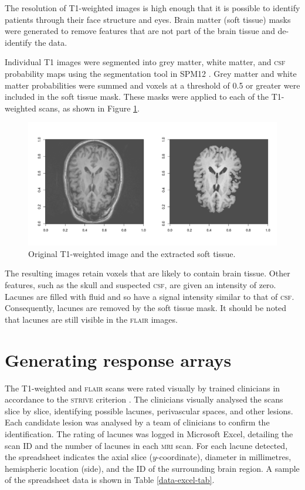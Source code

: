 The resolution of T1-weighted images is high enough that it is possible to identify patients through their face structure and eyes. Brain matter (soft tissue) masks were generated to remove features that are not part of the brain tissue and de-identify the data.

Individual T1 images were segmented into grey matter, white matter, and \textsc{csf} probability maps using the segmentation tool in SPM12 \citeyearpar{spm12}. Grey matter and white matter probabilities were summed and voxels at a threshold of 0.5 or greater were included in the soft tissue mask. These masks were applied to each of the T1-weighted scans, as shown in Figure \ref{data-t1-soft-fig}.

\begin{figure}[ht]
\centering
\includegraphics[width=\linewidth]{Images/6_t1_soft_eg.png}
\caption{Original T1-weighted image and the extracted soft tissue.}
\label{data-t1-soft-fig}
\end{figure}

The resulting images retain voxels that are likely to contain brain tissue. Other features, such as the skull and suspected \textsc{csf}, are given an intensity of zero. Lacunes are filled with fluid and so have a signal intensity similar to that of \textsc{csf}. Consequently, lacunes are removed by the soft tissue mask. It should be noted that lacunes are still visible in the \textsc{flair} images.

\section{Generating response arrays}\label{data-lacune}

The T1-weighted and \textsc{flair} scans were rated visually by trained clinicians in accordance to the \textsc{strive} criterion \cite{WardlawJ.M.2013Nsfr}. The clinicians visually analysed the scans slice by slice, identifying possible lacunes, perivascular spaces, and other lesions. Each candidate lesion was analysed by a team of clinicians to confirm the identification. The rating of lacunes was logged in Microsoft Excel, detailing the scan ID and the number of lacunes in each \textsc{mri} scan. For each lacune detected, the spreadsheet indicates the axial slice ($y$-coordinate), diameter in millimetres, hemispheric location (side), and the ID of the surrounding brain region. A sample of the spreadsheet data is shown in Table \ref{data-excel-tab}.

